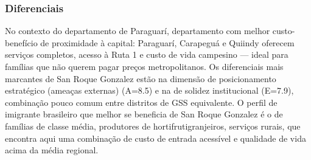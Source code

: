 \subsubsection*{Diferenciais}\label{dif-san-roque-gonzalez-0915}
No contexto do departamento de Paraguarí, departamento com melhor custo-benefício de proximidade à capital: Paraguarí, Carapeguá e Quiindy oferecem serviços completos, acesso à Ruta 1 e custo de vida campesino — ideal para famílias que não querem pagar preços metropolitanos. Os diferenciais mais marcantes de San Roque Gonzalez estão na dimensão de posicionamento estratégico (ameaças externas) (A=8.5) e na de solidez institucional (E=7.9), combinação pouco comum entre distritos de GSS equivalente. O perfil de imigrante brasileiro que melhor se beneficia de San Roque Gonzalez é o de famílias de classe média, produtores de hortifrutigranjeiros, serviços rurais, que encontra aqui uma combinação de custo de entrada acessível e qualidade de vida acima da média regional.
